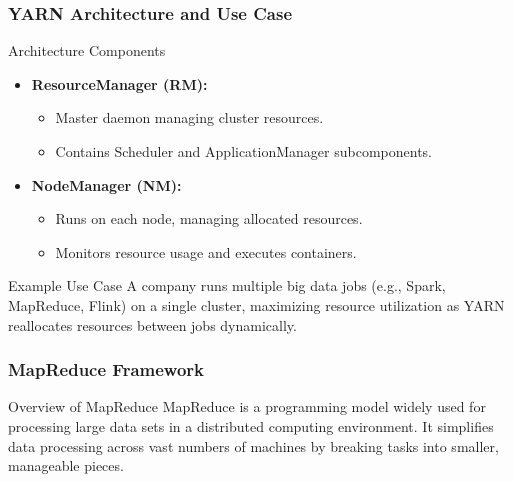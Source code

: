 \documentclass[aspectratio=169]{beamer}
\begin{document}
\begin{frame}[fragile]
    \frametitle{YARN Architecture and Use Case}
    \begin{block}{Architecture Components}
        \begin{itemize}
            \item \textbf{ResourceManager (RM):}
                \begin{itemize}
                    \item Master daemon managing cluster resources.
                    \item Contains Scheduler and ApplicationManager subcomponents.
                \end{itemize}
            \item \textbf{NodeManager (NM):}
                \begin{itemize}
                    \item Runs on each node, managing allocated resources.
                    \item Monitors resource usage and executes containers.
                \end{itemize}
        \end{itemize}
    \end{block}

    \begin{block}{Example Use Case}
        A company runs multiple big data jobs (e.g., Spark, MapReduce, Flink) on a single cluster, maximizing resource utilization as YARN reallocates resources between jobs dynamically.
    \end{block}
\end{frame}

\begin{frame}
  \frametitle{MapReduce Framework}
  \begin{block}{Overview of MapReduce}
    MapReduce is a programming model widely used for processing large data sets in a distributed computing environment. It simplifies data processing across vast numbers of machines by breaking tasks into smaller, manageable pieces.
  \end{block}
\end{frame}
\end{document}
